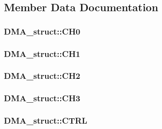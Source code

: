 \subsection{Member Data Documentation}
\hypertarget{struct_d_m_a__struct_a300907b06189fc8ee273d27ff62af2c3}{
\subsubsection[{CH0}]{ {\bf DMA\_\-struct::CH0}}}
\label{struct_d_m_a__struct_a300907b06189fc8ee273d27ff62af2c3}
\hypertarget{struct_d_m_a__struct_a35c9b96f75af8e346580d807e3903a9f}{
\subsubsection[{CH1}]{ {\bf DMA\_\-struct::CH1}}}
\label{struct_d_m_a__struct_a35c9b96f75af8e346580d807e3903a9f}
\hypertarget{struct_d_m_a__struct_af104b3c3e42207ce59c11ae14277f1ab}{
\subsubsection[{CH2}]{ {\bf DMA\_\-struct::CH2}}}
\label{struct_d_m_a__struct_af104b3c3e42207ce59c11ae14277f1ab}
\hypertarget{struct_d_m_a__struct_ae8047c3e73cf322e2dfa3b6e44db790c}{
\subsubsection[{CH3}]{ {\bf DMA\_\-struct::CH3}}}
\label{struct_d_m_a__struct_ae8047c3e73cf322e2dfa3b6e44db790c}
\hypertarget{struct_d_m_a__struct_addd691baed84baa8c51feb7ab1969ef0}{
\subsubsection[{CTRL}]{ {\bf DMA\_\-struct::CTRL}}}
